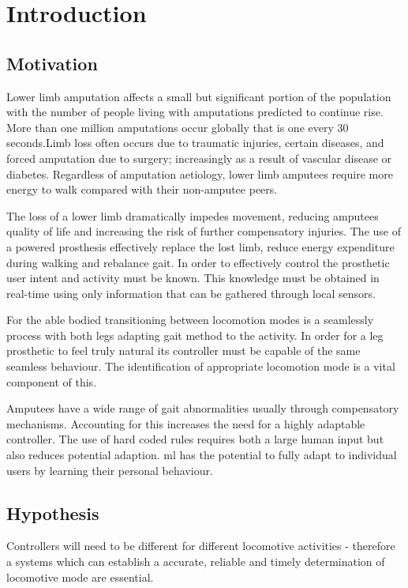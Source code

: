 \chapter{Introduction}
\label{chp:intro}

\section{Motivation}
Lower limb amputation affects a small but significant portion of the population with the number of people living with amputations predicted to continue rise. More than one million amputations occur globally that is one every 30 seconds.\cite{Asif2021}Limb loss often occurs due to traumatic injuries, certain diseases, and forced amputation due to surgery; increasingly as a result of vascular disease or diabetes\cite{Griffin2012, Walter2022}. Regardless of amputation aetiology, lower limb amputees require more energy to walk compared with their non-amputee peers\cite{Vllasolli2014}.

The loss of a lower limb dramatically impedes movement\cite{Gregg2014, Wong2021, Srisuwan2021}, reducing amputees quality of life and increasing the risk of further compensatory injuries. The use of a powered prosthesis effectively replace the lost limb, reduce energy expenditure during walking and rebalance gait\cite{Lin2014}. In order to effectively control the prosthetic user intent and activity must be known. This knowledge must be obtained in real-time using only information that can be gathered through local sensors.

For the able bodied transitioning between locomotion modes is a seamlessly process with both legs adapting gait method to the activity. In order for a leg prosthetic to feel truly natural its controller must be capable of the same seamless behaviour. The identification of appropriate locomotion mode is a vital component of this. 

Amputees have a wide range of gait abnormalities usually through compensatory mechanisms\cite{Tucker2015}. Accounting for this increases the need for a highly adaptable controller. The use of hard coded rules requires both a large human input but also reduces potential adaption. \acrfull{ml} has the potential to fully adapt to individual users by learning their personal behaviour.


\section{Hypothesis} %
Controllers will need to be different for different locomotive activities - therefore a systems which can establish a accurate, reliable and timely determination of locomotive mode are essential.

